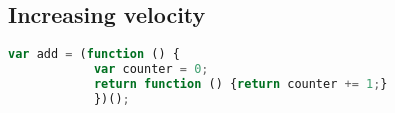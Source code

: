 	\subsection{Increasing velocity}
		
		\begin{lstlisting}[language=JavaScript, caption={Example of RxJS code.},label={lst:closure}]
			var add = (function () {
			var counter = 0;
			return function () {return counter += 1;}
			})();
		\end{lstlisting}
		
		
